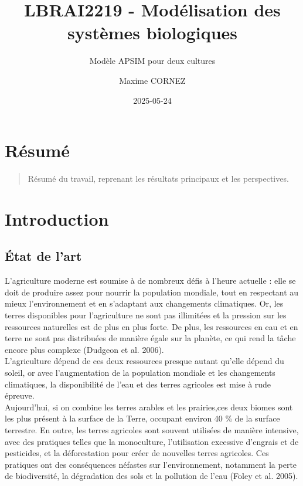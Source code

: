 \documentclass[
]{article}
\title{LBRAI2219 - Modélisation des systèmes biologiques}
\subtitle{Modèle APSIM pour deux cultures}
\author{Maxime CORNEZ}
\date{2025-05-24}
\begin{document}
\maketitle

{
\setcounter{tocdepth}{2}
\tableofcontents
}
\section{Résumé}\label{ruxe9sumuxe9}

\begin{quote}
Résumé du travail, reprenant les résultats principaux et les
perspectives.
\end{quote}

\section{Introduction}\label{introduction}

\subsection{État de l'art}\label{uxe9tat-de-lart}

L'agriculture moderne est soumise à de nombreux défis à l'heure actuelle
: elle se doit de produire assez pour nourrir la population mondiale,
tout en respectant au mieux l'environnement et en s'adaptant aux
changements climatiques. Or, les terres disponibles pour l'agriculture
ne sont pas illimitées et la pression sur les ressources naturelles est
de plus en plus forte. De plus, les ressources en eau et en terre ne
sont pas distribuées de manière égale sur la planète, ce qui rend la
tâche encore plus complexe (Dudgeon et al. 2006).\\
L'agriculture dépend de ces deux ressources presque autant qu'elle
dépend du soleil, or avec l'augmentation de la population mondiale et
les changements climatiques, la disponibilité de l'eau et des terres
agricoles est mise à rude épreuve.\\
Aujourd'hui, si on combine les terres arables et les prairies,ces deux
biomes sont les plus présent à la surface de la Terre, occupant environ
40 \% de la surface terrestre. En outre, les terres agricoles sont
souvent utilisées de manière intensive, avec des pratiques telles que la
monoculture, l'utilisation excessive d'engrais et de pesticides, et la
déforestation pour créer de nouvelles terres agricoles. Ces pratiques
ont des conséquences néfastes sur l'environnement, notamment la perte de
biodiversité, la dégradation des sols et la pollution de l'eau (Foley et
al. 2005).
\end{document}
